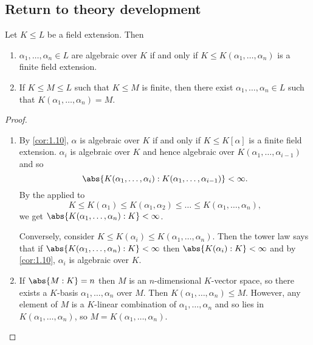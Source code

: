 \documentclass{article}
\begin{document}
\subsection{Return to theory development}
\begin{nlemma}\label{lem:1.19}
    Let $K \leq L$ be a field extension. Then
    \begin{enumerate}[label=(\roman*)]
        \item $\alpha_1, \dotsc, \alpha_n \in L$ are algebraic over $K$ if and only if $K \leq K(\alpha_1, \dotsc, \alpha_n)$ is a finite field extension.
        \item If $K \leq M \leq L$ such that $K \leq M$ is finite, then there exist $\alpha_1, \dotsc, \alpha_n \in L$ such that $K(\alpha_1, \dotsc, \alpha_n) = M$.
    \end{enumerate}
\end{nlemma}
\begin{proof} \leavevmode
    \begin{enumerate}[label=(\roman*)]
        \item By \cref{cor:1.10}, $\alpha$ is algebraic over $K$ if and only if $K \leq K[\alpha]$ is a finite field extension.
            $\alpha_i$ is algebraic over $K$ and hence algebraic over $K(\alpha_1, \dotsc, \alpha_{i-1})$ and so
            \begin{equation*}\abs{K(\alpha_1, \dotsc, \alpha_i):K(\alpha_1, \dotsc, \alpha_{i-1})} < \infty.\end{equation*}
            By the  applied to
            \begin{equation*}K \leq K(\alpha_1) \leq K(\alpha_1, \alpha_2) \leq \dots \leq K(\alpha_1, \dotsc, \alpha_n),\end{equation*} we get $\abs{K(\alpha_1, \dotsc, \alpha_n):K} < \infty$.

            Conversely, consider $K \leq K(\alpha_i) \leq K(\alpha_1, \dotsc, \alpha_n)$.
            Then the tower law says that if $\abs{K(\alpha_1, \dotsc, \alpha_n): K} < \infty$ then $\abs{K(\alpha_i):K} < \infty$ and by \cref{cor:1.10}, $\alpha_i$ is algebraic over $K$.

        \item If $\abs{M:K} = n$ then $M$ is an $n$-dimensional $K$-vector space, so there exists a $K$-basis $\alpha_1, \dotsc, \alpha_n$ over $M$.
            Then $K(\alpha_1, \dotsc, \alpha_n) \leq M$.
            However, any element of $M$ is a $K$-linear combination of $\alpha_1, \dotsc, \alpha_n$ and so lies in $K(\alpha_1, \dotsc, \alpha_n)$, so $M = K(\alpha_1, \dotsc, \alpha_n)$. \qedhere
    \end{enumerate}
\end{proof}
\end{document}
